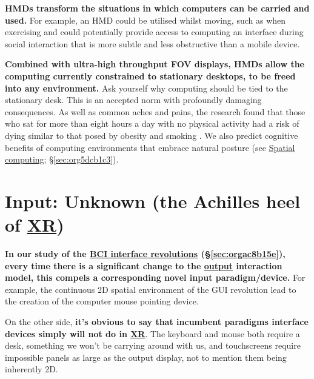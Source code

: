 \documentclass[logo,bsc,singlespacing,parskip]{infthesis}
\begin{document}
\textbf{HMDs transform the situations in which computers can be carried and used.}
For example, an HMD could be utilised whilst moving, such as when exercising and could potentially provide access to computing an interface during social interaction that is more subtle and less obstructive than a mobile device.

\textbf{Combined with ultra-high throughput FOV displays, HMDs allow the computing currently constrained to stationary desktops, to be freed into any environment.}
Ask yourself why computing should be tied to the stationary desk.
This is an accepted norm with profoundly damaging consequences.
As well as common aches and pains, the research found that those who sat for more than eight hours a day with no physical activity had a risk of dying similar to that posed by obesity and smoking \autocite{laskowskiSittingRisksHow}.
We also predict cognitive benefits of computing environments that embrace natural posture (see \hyperref[sec:org5dcb1c3]{Spatial computing}; \S \ref{sec:org5dcb1c3}).

\section{Input: Unknown (the Achilles heel of \hyperref[orgf7f8e78]{XR})}
\label{sec:org23de37e}
\textbf{In our study of the \hyperref[sec:orgac8b15e]{BCI interface revolutions} (\S \ref{sec:orgac8b15e}), every time there is a significant change to the \hyperref[output]{output} interaction model, this compels a corresponding novel input paradigm/device.}
For example, the continuous 2D spatial environment of the GUI revolution lead to the creation of the computer mouse pointing device.

On the other side, \textbf{it's obvious to say that incumbent paradigms interface devices simply will not do in \hyperref[orgf7f8e78]{XR}}.
The keyboard and mouse both require a desk, something we won't be carrying around with us, and touchscreens require impossible panels as large as the output display, not to mention them being inherently 2D.
\end{document}
